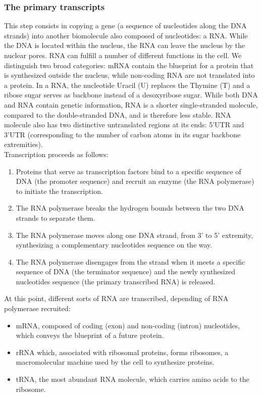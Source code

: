 \subsubsection{The primary transcripts}

This step consists in copying a gene (a sequence of nucleotides along the \ac{DNA} strands) into another biomolecule also composed of nucleotides: a \ac{RNA}.
While the \ac{DNA} is located within the nucleus, the \ac{RNA} can leave the nucleus by the nuclear pores.
\ac{RNA} can fulfill a number of different functions in the cell.
We distinguish two broad categories: \ac{mRNA} contain the blueprint for a protein that is synthesized outside the nucleus, while non-coding \ac{RNA} are not translated into a protein.
In a \ac{RNA}, the nucleotide Uracil (U) replaces the Thymine (T) and a ribose sugar serves as backbone instead of a desoxyribose sugar.
While both \ac{DNA} and \ac{RNA} contain genetic information, \ac{RNA} is a shorter single-stranded molecule, compared to the double-stranded \ac{DNA}, and is therefore less stable.
\ac{RNA} molecule also has two distinctive untranslated regions at its ends: 5'UTR and 3'UTR (corresponding to the number of carbon atoms in its sugar backbone extremities).\\

\noindent
Transcription proceeds as follows:
\begin{enumerate}
	\setlength\itemsep{0.1em}
	\item Proteins that serve as transcription factors bind to a specific sequence of \ac{DNA} (the promoter sequence) and recruit an enzyme (the \ac{RNA} polymerase) to initiate the transcription.
	\item The \ac{RNA} polymerase breaks the hydrogen bounds between the two \ac{DNA} strands to separate them.
	\item The \ac{RNA} polymerase moves along one \ac{DNA} strand, from 3' to 5' extremity, synthesizing a complementary nucleotides sequence on the way.
	\item The \ac{RNA} polymerase disengages from the strand when it meets a specific sequence of \ac{DNA} (the terminator sequence) and the newly synthesized nucleotides sequence (the primary transcribed \ac{RNA}) is released.
\end{enumerate}

\noindent
At this point, different sorts of \ac{RNA} are transcribed, depending of \ac{RNA} polymerase recruited:
\begin{itemize}
	\setlength\itemsep{0.1em}
	\item \ac{mRNA}, composed of coding (exon) and non-coding (intron) nucleotides, which conveys the blueprint of a future protein.
	\item \ac{rRNA} which, associated with ribosomal proteins, forms ribosomes, a macromolecular machine used by the cell to synthesize proteins.
	\item \ac{tRNA}, the most abundant \ac{RNA} molecule, which carries amino acids to the ribosome.
\end{itemize}

